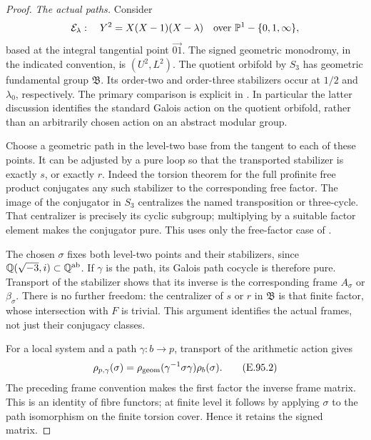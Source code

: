 \begin{proof}
\emph{The actual paths.}
Consider
\[
 \mathcal E_\lambda:\quad Y^2=X(X-1)(X-\lambda)
 \quad\hbox{over }\mathbb P^1-\{0,1,\infty\},
\]
based at the integral tangential point \(\overrightarrow{01}\).
The signed geometric monodromy, in the indicated convention, is
\((U^2,L^2)\).  The quotient orbifold by \(S_3\) has geometric
fundamental group \(\mathfrak B\).  Its order-two and order-three
stabilizers occur at \(1/2\) and \(\lambda_0\), respectively.
The primary comparison is explicit in
\citet[Proposition~2.19, p.437; \S4.14, equation~(4.15), p.445;
Theorem~4.16 and its proof, p.446; \S5, p.447]{SymNTY2010}.
In particular the latter discussion identifies the standard
Galois action on the quotient orbifold, rather than an arbitrarily
chosen action on an abstract modular group.

Choose a geometric path in the level-two base from the tangent to
each of these points.  It can be adjusted by a pure loop so that
the transported stabilizer is exactly \(s\), or exactly \(r\).
Indeed the torsion theorem for the full profinite free product
conjugates any such stabilizer to the corresponding free factor.
The image of the conjugator in \(S_3\) centralizes the named
transposition or three-cycle.  That centralizer is precisely its
cyclic subgroup; multiplying by a suitable factor element makes
the conjugator pure.  This uses only the free-factor case of
\citet[Theorem~B, pp.159--160]{SymHerfortRibes1985}.

The chosen \(\sigma\) fixes both level-two points and their
stabilizers, since \(\mathbb Q(\sqrt{-3},i)\subset\mathbb Q^{\rm ab}\).
If \(\gamma\) is the path, its Galois path cocycle is therefore
pure.  Transport of the stabilizer shows that its inverse is the
corresponding frame \(A_\sigma\) or \(\beta_\sigma\).
There is no further freedom: the centralizer of \(s\) or \(r\)
in \(\mathfrak B\) is that finite factor, whose intersection
with \(F\) is trivial.  This argument identifies the actual
frames, not just their conjugacy classes.

For a local system and a path \(\gamma:b\to p\), transport of
the arithmetic action gives
\[
  \rho_{p,\gamma}(\sigma)
       =\rho_{\rm geom}(\gamma^{-1}\sigma\gamma)\rho_b(\sigma).
                                                        \tag{E.95.2}
\]
The preceding frame convention makes the first factor the inverse
frame matrix.  This is an identity of fibre functors; at finite
level it follows by applying \(\sigma\) to the path isomorphism
on the finite torsion cover.  Hence it retains the signed matrix.


\end{proof}
